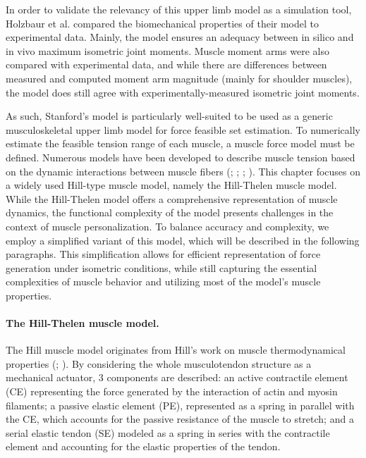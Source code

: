 In order to validate the relevancy of this upper limb model as a simulation tool, Holzbaur et al. compared the biomechanical properties of their model to experimental data. Mainly, the model ensures an adequacy between in silico and in vivo maximum isometric joint moments. Muscle moment arms were also compared with experimental data, and while there are differences between measured and computed moment arm magnitude (mainly for shoulder muscles), the model does still agree with experimentally-measured isometric joint moments.

As such, Stanford's model is particularly well-suited to be used as a generic musculoskeletal upper limb model for force feasible set estimation. To numerically estimate the feasible tension range of each muscle, a muscle force model must be defined.
Numerous models have been developed to describe muscle tension based on the dynamic interactions between muscle fibers (\cite{zajacMuscleTendonProperties1989a}; \cite{thelenAdjustmentMuscleMechanics2003}; \cite{cadovaComparativeStudyMuscle2014}; \cite{millardFlexingComputationalMuscle2013a}). This chapter focuses on a widely used Hill-type muscle model, namely the Hill-Thelen muscle model.  While the Hill-Thelen model offers a comprehensive representation of muscle dynamics, the functional complexity of the model presents challenges in the context of muscle personalization.
To balance accuracy and complexity, we employ a simplified variant of this model, which will be described in the following paragraphs. This simplification allows for efficient representation of force generation under isometric conditions, while still capturing the essential complexities of muscle behavior and utilizing most of the model's muscle properties.

\paragraph*{The Hill-Thelen muscle model.} The Hill muscle model originates from Hill's work on muscle thermodynamical properties (\cite{hillHeatShorteningDynamic1938}; \cite{zajacMuscleTendonProperties1989a}). By considering the whole musculotendon structure as a mechanical actuator, 3 components are described: an active contractile element (CE) representing the force generated by the interaction of actin and myosin filaments; a passive elastic element (PE), represented as a spring in parallel with the CE, which accounts for the passive resistance of the muscle to stretch; and a serial elastic tendon (SE) modeled as a spring in series with the contractile element and accounting for the elastic properties of the tendon. 

